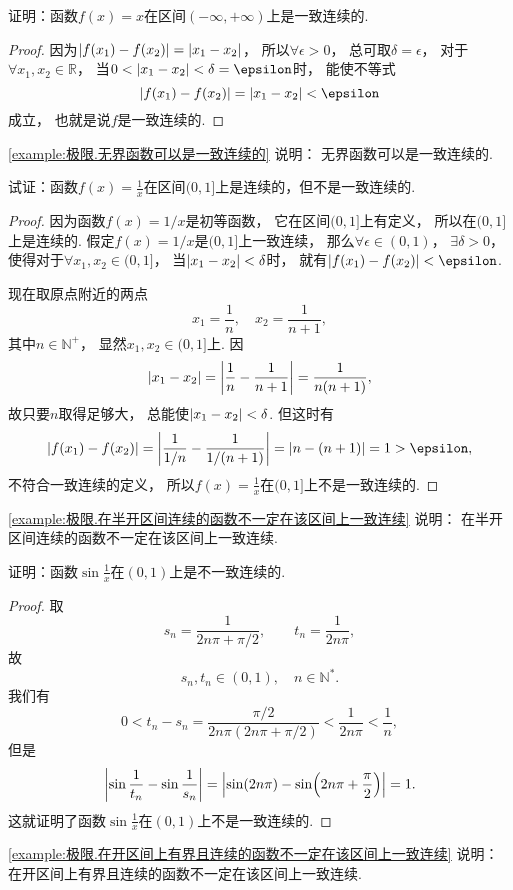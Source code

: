 \begin{example}\label{example:极限.无界函数可以是一致连续的}
证明：函数\(f(x)=x\)在区间\((-\infty,+\infty)\)上是一致连续的.
\begin{proof}
因为\(\abs{f(x_1)-f(x_2)}=\abs{x_1-x_2}\)，
所以\(\forall\epsilon>0\)，
总可取\(\delta=\epsilon\)，
对于\(\forall x_1,x_2\in\mathbb{R}\)，
当\(0<\abs{x_1-x_2}<\delta=\epsilon\)时，
能使不等式\[
	\abs{f(x_1)-f(x_2)} = \abs{x_1-x_2} < \epsilon
\]成立，
也就是说\(f\)是一致连续的.
\end{proof}
\end{example}
\begin{remark}
\cref{example:极限.无界函数可以是一致连续的} 说明：
无界函数可以是一致连续的.
\end{remark}

\begin{example}\label{example:极限.在半开区间连续的函数不一定在该区间上一致连续}
试证：函数\(f(x) = \frac{1}{x}\)在区间\((0,1]\)上是连续的，但不是一致连续的.
\begin{proof}
因为函数\(f(x) = 1/x\)是初等函数，
它在区间\((0,1]\)上有定义，
所以在\((0,1]\)上是连续的.
假定\(f(x) = 1/x\)是\((0,1]\)上一致连续，
那么\(\forall \epsilon \in (0,1)\)，
\(\exists \delta > 0\)，
使得对于\(\forall x_1,x_2 \in (0,1]\)，
当\(\abs{x_1 - x_2} < \delta\)时，
就有\(\abs{f(x_1) - f(x_2)} < \epsilon\).

现在取原点附近的两点\[
	x_1 = \frac{1}{n}, \quad
	x_2 = \frac{1}{n+1},
\]
其中\(n\in\mathbb{N}^+\)，
显然\(x_1,x_2 \in (0,1]\)上.
因\[
	\abs{x_1 - x_2} = \abs{\frac{1}{n} - \frac{1}{n+1}}
	= \frac{1}{n(n+1)},
\]
故只要\(n\)取得足够大，
总能使\(\abs{x_1 - x_2} < \delta\).
但这时有\[
	\abs{f(x_1) - f(x_2)}
	= \abs{\frac{1}{1/n} - \frac{1}{1/(n+1)}}
	= \abs{n - (n+1)}
	= 1 > \epsilon,
\]
不符合一致连续的定义，
所以\(f(x) = \frac{1}{x}\)在\((0,1]\)上不是一致连续的.
\end{proof}
\end{example}
\begin{remark}
\cref{example:极限.在半开区间连续的函数不一定在该区间上一致连续} 说明：
在半开区间连续的函数不一定在该区间上一致连续.
\end{remark}

\begin{example}\label{example:极限.在开区间上有界且连续的函数不一定在该区间上一致连续}
证明：函数\(\sin\frac{1}{x}\)在\((0,1)\)上是不一致连续的.
\begin{proof}
取\[
	s_n = \frac{1}{2n\pi+\pi/2},
	\qquad
	t_n = \frac{1}{2n\pi},
\]
故\[
	s_n,t_n\in(0,1),
	\quad n\in\mathbb{N}^*.
\]我们有\[
	0 < t_n - s_n = \frac{\pi/2}{2n\pi(2n\pi+\pi/2)} < \frac{1}{2n\pi} < \frac{1}{n},
\]
但是\[
	\abs{\sin\frac{1}{t_n} - \sin\frac{1}{s_n}}
	= \abs{\sin(2n\pi) - \sin(2n\pi+\frac{\pi}{2})}
	= 1.
\]
这就证明了函数\(\sin\frac{1}{x}\)在\((0,1)\)上不是一致连续的.
\end{proof}
\end{example}
\begin{remark}
\cref{example:极限.在开区间上有界且连续的函数不一定在该区间上一致连续} 说明：
在开区间上有界且连续的函数不一定在该区间上一致连续.
\end{remark}

